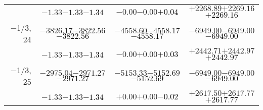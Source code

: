 \documentclass[compress]{beamer}
\begin{document}
\begin{frame}
{\begin{tabular}{r | c | c | c}
           & $-1.33$\hspace{0.1 cm}$-1.33$\hspace{0.1 cm}\textcolor{black}{$-1.34$} & $-0.00$\hspace{0.1 cm}$-0.00$\hspace{0.1 cm}\textcolor{black}{$+0.04$} & $+2268.89$\hspace{0.1 cm}$+2269.16$\hspace{0.1 cm}\textcolor{black}{$+2269.16$} \\
$-$1/3, 24 & $-3826.17$\hspace{0.1 cm}$-3822.56$\hspace{0.1 cm}\textcolor{black}{$-3822.56$} & $-4558.60$\hspace{0.1 cm}$-4558.17$\hspace{0.1 cm}\textcolor{black}{$-4558.17$} & $-6949.00$\hspace{0.1 cm}$-6949.00$\hspace{0.1 cm}\textcolor{black}{$-6949.00$} \\
           & $-1.33$\hspace{0.1 cm}$-1.33$\hspace{0.1 cm}\textcolor{black}{$-1.34$} & $-0.00$\hspace{0.1 cm}$+0.00$\hspace{0.1 cm}\textcolor{black}{$+0.03$} & $+2442.71$\hspace{0.1 cm}$+2442.97$\hspace{0.1 cm}\textcolor{black}{$+2442.97$} \\
$-$1/3, 25 & $-2975.04$\hspace{0.1 cm}$-2971.27$\hspace{0.1 cm}\textcolor{black}{$-2971.27$} & $-5153.33$\hspace{0.1 cm}$-5152.69$\hspace{0.1 cm}\textcolor{black}{$-5152.69$} & $-6949.00$\hspace{0.1 cm}$-6949.00$\hspace{0.1 cm}\textcolor{black}{$-6949.00$} \\
           & $-1.33$\hspace{0.1 cm}$-1.33$\hspace{0.1 cm}\textcolor{black}{$-1.34$} & $+0.00$\hspace{0.1 cm}$+0.00$\hspace{0.1 cm}\textcolor{black}{$-0.02$} & $+2617.50$\hspace{0.1 cm}$+2617.77$\hspace{0.1 cm}\textcolor{black}{$+2617.77$} \\

\end{tabular}}
\end{frame}
\end{document}
